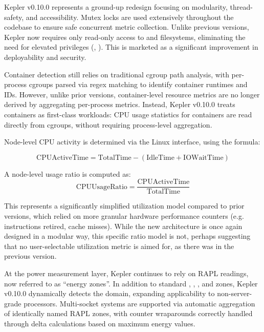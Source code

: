 Kepler v0.10.0 represents a ground-up redesign focusing on modularity, thread-safety, and accessibility. Mutex locks are used extensively throughout the codebase to ensure safe concurrent metric collection. Unlike previous versions, Kepler now requires only read-only access to  and  filesystems, eliminating the need for elevated privileges (, ). This is marketed as a significant improvement in deployability and security.

Container detection still relies on traditional cgroup path analysis, with per-process cgroups parsed via regex matching to identify container runtimes and IDs. However, unlike prior versions, container-level resource metrics are no longer derived by aggregating per-process metrics. Instead, Kepler v0.10.0 treats containers as first-class workloads: CPU usage statistics for containers are read directly from cgroups, without requiring process-level aggregation.

Node-level CPU activity is determined via the Linux  interface, using the formula:

\begin{equation}
\text{CPUActiveTime} = \text{TotalTime} - (\text{IdleTime} + \text{IOWaitTime})
\end{equation}

A node-level usage ratio is computed as:
\begin{equation}
\text{CPUUsageRatio} = \frac{\text{CPUActiveTime}}{\text{TotalTime}}
\end{equation}

This represents a significantly simplified utilization model compared to prior versions, which relied on more granular hardware performance counters (e.g. instructions retired, cache misses). While the new architecture is once again designed in a modular way, this specific ratio model is not, perhaps suggesting that no user-selectable utilization metric is aimed for, as there was in the previous version.

At the power measurement layer, Kepler continues to rely on RAPL readings, now referred to as ``energy zones''. In addition to standard , , , and  zones, Kepler v0.10.0 dynamically detects the  domain, expanding applicability to non-server-grade processors. Multi-socket systems are supported via automatic aggregation of identically named RAPL zones, with counter wraparounds correctly handled through delta calculations based on maximum energy values.

